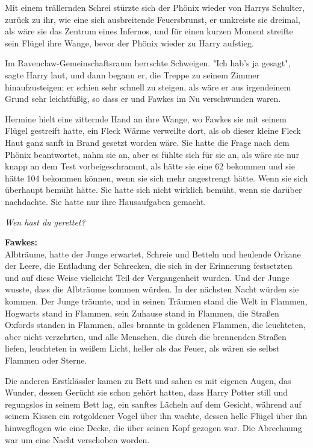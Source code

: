 {Mit einem trällernden Schrei stürzte sich der Phönix wieder von Harrys Schulter, zurück zu ihr, wie eine sich ausbreitende Feuersbrunst, er umkreiste sie dreimal, als wäre sie das Zentrum eines Infernos, und für einen kurzen Moment streifte sein Flügel ihre Wange, bevor der Phönix wieder zu Harry aufstieg.

Im Ravenclaw-Gemeinschaftsraum herrschte Schweigen. "Ich hab's ja gesagt", sagte Harry laut, und dann begann er, die Treppe zu seinem Zimmer hinaufzusteigen; er schien sehr schnell zu steigen, als wäre er aus irgendeinem Grund sehr leichtfüßig, so dass er und Fawkes im Nu verschwunden waren.

Hermine hielt eine zitternde Hand an ihre Wange, wo Fawkes sie mit seinem Flügel gestreift hatte, ein Fleck Wärme verweilte dort, als ob dieser kleine Fleck Haut ganz sanft in Brand gesetzt worden wäre. Sie hatte die Frage nach dem Phönix beantwortet, nahm sie an, aber es fühlte sich für sie an, als wäre sie nur knapp an dem Test vorbeigeschrammt, als hätte sie eine 62 bekommen und sie hätte 104 bekommen können, wenn sie sich mehr angestrengt hätte. Wenn sie sich überhaupt bemüht hätte. Sie hatte sich nicht wirklich bemüht, wenn sie darüber nachdachte. Sie hatte nur ihre Hausaufgaben gemacht.

\emph{Wen hast du gerettet?}

\textbf{Fawkes:}\\ Albträume, hatte der Junge erwartet, Schreie und Betteln und heulende Orkane der Leere, die Entladung der Schrecken, die sich in der Erinnerung festsetzten und auf diese Weise vielleicht Teil der Vergangenheit wurden. Und der Junge wusste, dass die Albträume kommen würden. In der nächsten Nacht würden sie kommen. Der Junge träumte, und in seinen Träumen stand die Welt in Flammen, Hogwarts stand in Flammen, sein Zuhause stand in Flammen, die Straßen Oxfords standen in Flammen, alles brannte in goldenen Flammen, die leuchteten, aber nicht verzehrten, und alle Menschen, die durch die brennenden Straßen liefen, leuchteten in weißem Licht, heller als das Feuer, als wären sie selbst Flammen oder Sterne.

Die anderen Erstklässler kamen zu Bett und sahen es mit eigenen Augen, das Wunder, dessen Gerücht sie schon gehört hatten, dass Harry Potter still und regungslos in seinem Bett lag, ein sanftes Lächeln auf dem Gesicht, während auf seinem Kissen ein rotgoldener Vogel über ihn wachte, dessen helle Flügel über ihn hinwegflogen wie eine Decke, die über seinen Kopf gezogen war. Die Abrechnung war um eine Nacht verschoben worden.

}
